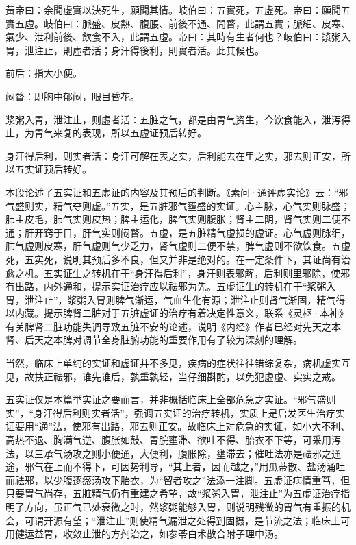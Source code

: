 \documentclass[draft,12pt]{ctexbook}
\begin{document}

\begin{yuanwen}
黃帝曰：余聞虛實以決死生，願聞其情。岐伯曰：五實死，五虛死。帝曰：願聞五實五虛。岐伯曰：脈盛、皮熱、腹脹、前後不通、問瞀，此謂五實；脈細、皮寒、氣少、泄利前後、飲食不入，此謂五虛。帝曰：其時有生者何也？岐伯曰：漿粥入胃，泄注止，則虛者活；身汗得後利，則實者活。此其候也。
\end{yuanwen}


\begin{jiaozhu}
	\item 前后：指大小便。
	\item 闷瞀：即胸中郁闷，眼目昏花。
	\item 浆粥入胃，泄注止，则虚者活：五脏之气，都是由胃气资生，今饮食能入，泄泻得止，为胃气来复的表现，所以五虚证预后转好。
	\item 身汗得后利，则实者活：身汗可解在表之实，后利能去在里之实，邪去则正安，所以五实证预后转好。
\end{jiaozhu}



本段论述了五实证和五虚证的内容及其预后的判断。《素问·通评虚实论》云：“邪气盛则实，精气夺则虚。”五实，是五脏邪气壅盛的实证。心主脉，心气实则脉盛；肺主皮毛，肺气实则皮热；脾主运化，脾气实则腹胀；肾主二阴，肾气实则二便不通；肝开窍于目，肝气实则闷瞀。五虚，是五脏精气虚损的虚证。心气虚则脉细，肺气虚则皮寒，肝气虚则气少乏力，肾气虚则二便不禁，脾气虚则不欲饮食。五虚死，五实死，说明其预后多不良，但又并非是绝对的。在一定条件下，其证尚有治愈之机。五实证生之转机在于“身汗得后利”，身汗则表邪解，后利则里邪除，使邪有出路，内外通和，提示实证治疗应以祛邪为先。五虚证生的转机在于“浆粥入胃，泄注止”，浆粥入胃则脾气渐运，气血生化有源；泄注止则肾气渐固，精气得以内藏。提示脾肾二脏对于五脏虚证的治疗有着决定性意义，联系《灵枢·本神》有关脾肾二脏功能失调导致五脏不安的论述，说明《内经》作者已经对先天之本肾、后天之本脾对调节全身脏腑功能的重要作用有了较为深刻的理解。

当然，临床上单纯的实证和虚证并不多见，疾病的症状往往错综复杂，病机虚实互见，故扶正祛邪，谁先谁后，孰重孰轻，当仔细斟酌，以免犯虚虚、实实之戒。



五实证仅是本篇举实证之要而言，并非概括临床上全部危急之实证。“邪气盛则实”，“身汗得后利则实者活”，强调五实证的治疗转机，实质上是启发医生治疗实证要用“通”法，使邪有出路，邪去则正安。故临床上对危急的实证，如小大不利、高热不退、胸满气逆、腹胀如鼓、胃脘壅滞、欲吐不得、胎衣不下等，可采用泻法，以三承气汤攻之则小便通，大便利，腹胀除，壅滞去；催吐法亦是祛邪之通途，邪气在上而不得下，可因势利导，“其上者，因而越之，”用瓜蒂散、盐汤涌吐而祛邪，以少腹逐瘀汤攻下胎衣，为“留者攻之”法添一注脚。五虚证病情重笃，但只要胃气尚存，五脏精气仍有重建之希望，故“浆粥入胃，泄注止”为五虚证治疗指明了方向，虽正气已处衰微之时，然浆粥能够入胃，则说明残微的胃气有重振的机会，可谓开源有望；“泄注止”则使精气漏泄之处得到固摄，是节流之法；临床上可用健运益胃，收敛止泄的方剂治之，如参苓白术散合附子理中汤。
\end{document}
